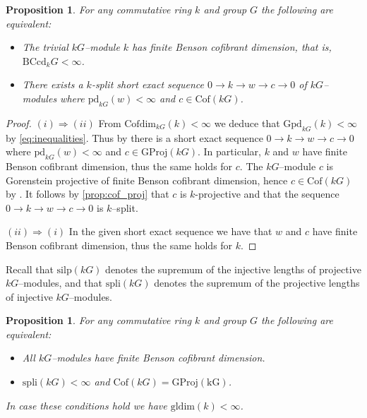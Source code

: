 \documentclass{amsart}
\numberwithin{equation}{section}%
\newtheorem{proposition}[equation]{Proposition}
\theoremstyle{remark}
\begin{document}
{\begin{proposition}
\label{prop:BC1}
For any commutative ring $k$ and group $G$ the following are equivalent:
\begin{itemize}
    \item[(i)] The trivial $kG$--module $k$ has finite Benson cofibrant dimension, that is, $\mathrm{BCcd}_{k}G<\infty$.
    \item[(ii)] There exists a $k$-split short exact sequence $0\rightarrow k\rightarrow w\rightarrow c\rightarrow 0$ of $kG$--modules where $\mathrm{pd}_{kG}(w)<\infty$ and $c\in\mathrm{Cof}(kG)$.
    \end{itemize}
\end{proposition}

\begin{proof}   
$(i)\Rightarrow(ii)$ From $\mathrm{Cofdim}_{kG}(k)<\infty$ we deduce that $\mathrm{Gpd}_{kG}(k)<\infty$  by \eqref{eq:inequalities}. Thus by \cite[Lemma~2.17]{CFH} there is a short exact sequence $0\rightarrow k\rightarrow w\rightarrow c\rightarrow 0$ where $\mathrm{pd}_{kG}(w)<\infty$ and $c\in \mathrm{GProj}(kG)$. In particular, $k$ and $w$ have finite Benson cofibrant dimension, thus the same holds for $c$. The $kG$--module $c$ is Gorenstein projective of finite Benson cofibrant dimension, hence $c\in\mathrm{Cof}(kG)$ by \cite[Proposition~2.2(i)]{ET_cof}. It follows by \cref{prop:cof_proj} that $c$ is $k$-projective and that the sequence $0\rightarrow k\rightarrow w\rightarrow c\rightarrow 0$ is $k$--split.

$(ii)\Rightarrow(i)$ In the given short exact sequence we have that $w$ and $c$ have finite Benson cofibrant dimension, thus the same holds for $k$.
\end{proof}

Recall that $\mathrm{silp}(kG)$ denotes the supremum of the injective lengths of projective $kG$--modules, and  that $\mathrm{spli}(kG)$ denotes the supremum of the projective lengths of injective $kG$--modules.

\begin{proposition}
\label{prop:BC2}
For any commutative ring $k$ and group $G$ the following are equivalent:
\begin{itemize}
    \item[(i)] All $kG$--modules have finite Benson cofibrant dimension.
    \item[(ii)] $\mathrm{spli}(kG)<\infty$ and $\mathrm{Cof}(kG)=\mathrm{GProj(kG)}$.
\end{itemize}
In case these conditions hold we have $\mathrm{gldim}(k)<\infty$.
\end{proposition}

}
\end{document}

